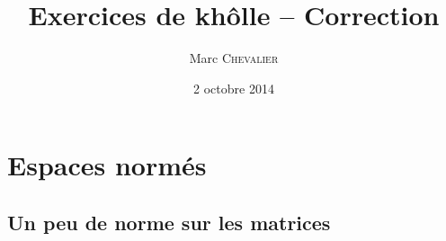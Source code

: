

\title{Exercices de khôlle \--- Correction}
\author{Marc \textsc{Chevalier}}
\date{2 octobre 2014}


\maketitle
\setcounter{tocdepth}{2}
\tableofcontents

\section{Espaces normés}

\subsection{Un peu de norme sur les matrices}

